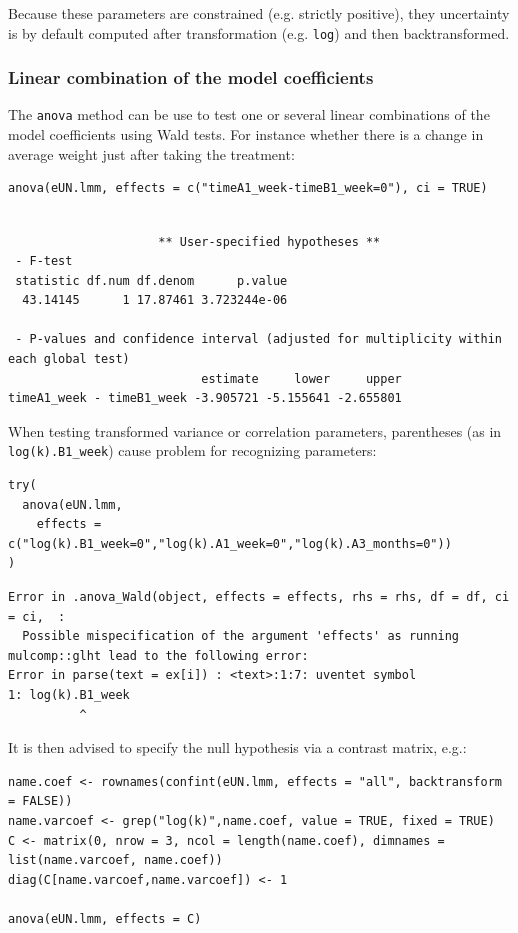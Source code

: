 \documentclass[12pt]{article}
\begin{document}
Because these parameters are constrained (e.g. strictly positive),
they uncertainty is by default computed after transformation
(e.g. \texttt{log}) and then backtransformed. 

\subsubsection{Linear combination of the model coefficients}
\label{sec:org0e5152e}

The \texttt{anova} method can be use to test one or several linear
combinations of the model coefficients using Wald tests. For instance
whether there is a change in average weight just after taking the
treatment:
\lstset{language=r,label= ,caption= ,captionpos=b,numbers=none}
\begin{lstlisting}
anova(eUN.lmm, effects = c("timeA1_week-timeB1_week=0"), ci = TRUE)
\end{lstlisting}

\begin{verbatim}

                     ** User-specified hypotheses ** 
 - F-test
 statistic df.num df.denom      p.value
  43.14145      1 17.87461 3.723244e-06

 - P-values and confidence interval (adjusted for multiplicity within each global test) 
                           estimate     lower     upper
timeA1_week - timeB1_week -3.905721 -5.155641 -2.655801
\end{verbatim}


When testing transformed variance or correlation parameters,
parentheses (as in \texttt{log(k).B1\_week}) cause problem for recognizing
parameters:
\lstset{language=r,label= ,caption= ,captionpos=b,numbers=none}
\begin{lstlisting}
try(
  anova(eUN.lmm,
	effects = c("log(k).B1_week=0","log(k).A1_week=0","log(k).A3_months=0"))
)
\end{lstlisting}

\begin{verbatim}
Error in .anova_Wald(object, effects = effects, rhs = rhs, df = df, ci = ci,  : 
  Possible mispecification of the argument 'effects' as running mulcomp::glht lead to the following error: 
Error in parse(text = ex[i]) : <text>:1:7: uventet symbol
1: log(k).B1_week
          ^
\end{verbatim}


\clearpage

It is then advised to specify the null hypothesis via a contrast matrix, e.g.:
\lstset{language=r,label= ,caption= ,captionpos=b,numbers=none}
\begin{lstlisting}
name.coef <- rownames(confint(eUN.lmm, effects = "all", backtransform = FALSE))
name.varcoef <- grep("log(k)",name.coef, value = TRUE, fixed = TRUE)
C <- matrix(0, nrow = 3, ncol = length(name.coef), dimnames = list(name.varcoef, name.coef))
diag(C[name.varcoef,name.varcoef]) <- 1

anova(eUN.lmm, effects = C)
\end{lstlisting}
\end{document}
